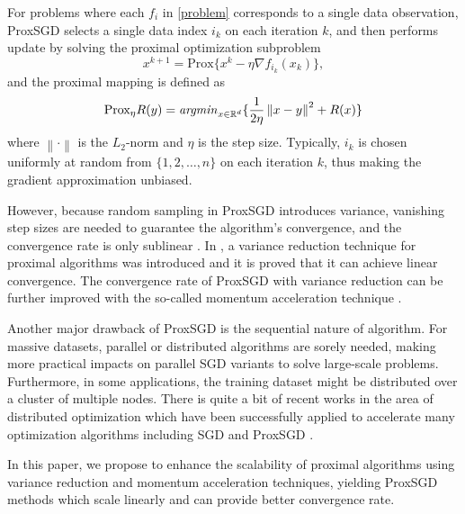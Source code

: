 \documentclass[10pt, conference, compsocconf]{IEEEtran}
\newcommand*{\R}{\mathbb{R}}
\newcommand*{\Po}{\text{Prox}}
\newcommand{\norm}[1]{\left\lVert#1\right\rVert}
\theoremstyle{definition}
\theoremstyle{remark}
\begin{document}
For problems where each $f_i$ in \eqref{problem} corresponds to a single data observation, ProxSGD selects a single data index $i_k$ on each iteration $k$, and then performs update by solving the proximal optimization subproblem
\[
x^{k+1} = \Po\{x^{k} -\eta \nabla f_{i_k} (x_k)\},
\]
and the proximal mapping is defined as 
\[
\Po_{\eta}R(y) = \displaystyle{\it argmin}_{x\in\R^d}\{\frac{1}{2\eta}\norm{x-y}^2+R(x)\}
\]
where $\norm{\cdot}$ is the $L_2$-norm and $\eta$ is the step size.
Typically, $i_k$ is chosen uniformly at random from $\{1, 2,\ldots, n\}$ on each iteration $k$, thus making the gradient approximation unbiased. 

However, because random sampling in ProxSGD introduces variance, vanishing step sizes are needed to guarantee the algorithm's convergence,
and the convergence rate is only sublinear \cite{Langford2009, Rakhlin2012}. In \cite{Xiao2014}, a variance reduction technique for proximal algorithms was introduced and it is proved that it can achieve linear convergence. The convergence rate of ProxSGD with variance reduction can be further improved with the so-called momentum acceleration technique \cite{Allen-Zhu17}.

Another major drawback of ProxSGD is the sequential nature of algorithm. For massive datasets, parallel or distributed algorithms are sorely needed, making more practical impacts on parallel SGD variants to solve large-scale problems. Furthermore, in some applications, the training dataset might be distributed over a cluster of multiple nodes. There is quite a bit of recent works in the area of distributed optimization which have been successfully applied to accelerate many optimization algorithms including SGD \cite{Agarwal2014,Recht2011,Mania2017} and ProxSGD \cite{LiP2016,Meng2017}.   

In this paper, we propose to enhance the scalability of proximal algorithms using variance reduction and momentum acceleration techniques, yielding ProxSGD methods which scale linearly and can provide better convergence rate.
\end{document}
